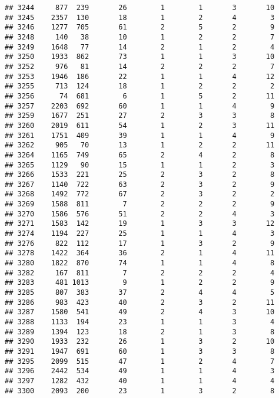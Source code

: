 \documentclass[]{article}
\begin{document}
\begin{verbatim}
## 3244     877  239       26        1        1       3       10
## 3245    2357  130       18        1        2       4        3
## 3246    1277  705       61        2        5       2        9
## 3248     140   38       10        1        2       2        7
## 3249    1648   77       14        2        1       2        4
## 3250    1933  862       73        1        1       3       10
## 3252     976   81       14        2        2       2        7
## 3253    1946  186       22        1        1       4       12
## 3255     713  124       18        1        2       2        2
## 3256      74  681        6        1        5       2       11
## 3257    2203  692       60        1        1       4        9
## 3259    1677  251       27        2        3       3        8
## 3260    2019  611       54        1        2       3       11
## 3261    1751  409       39        1        1       4        9
## 3262     905   70       13        1        2       2       11
## 3264    1165  749       65        2        4       2        8
## 3265    1129   90       15        1        1       2        3
## 3266    1533  221       25        2        3       2        8
## 3267    1140  722       63        2        3       2        9
## 3268    1492  772       67        2        3       2        2
## 3269    1588  811        7        2        2       2        9
## 3270    1586  576       51        2        2       4        3
## 3271    1583  142       19        1        3       3       12
## 3274    1194  227       25        1        1       4        3
## 3276     822  112       17        1        3       2        9
## 3278    1422  364       36        2        1       4       11
## 3280    1822  870       74        1        1       4        8
## 3282     167  811        7        2        2       2        4
## 3283     481 1013        9        1        2       2        9
## 3285     807  383       37        2        4       4        5
## 3286     983  423       40        2        3       2       11
## 3287    1580  541       49        2        4       3       10
## 3288    1133  194       23        1        1       3        4
## 3289    1394  123       18        2        1       3        8
## 3290    1933  232       26        1        3       2       10
## 3291    1947  691       60        1        3       3        8
## 3295    2099  515       47        1        2       4        7
## 3296    2442  534       49        1        1       4        3
## 3297    1282  432       40        1        1       4        4
## 3300    2093  200       23        1        3       2        8

\end{verbatim}
\end{document}
